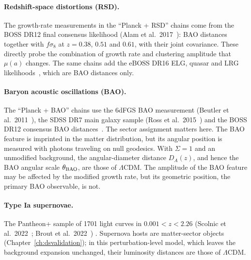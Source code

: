 \paragraph{Redshift-space distortions (RSD).} The growth-rate measurements in the ``Planck + RSD'' chains come from the BOSS DR12 final consensus
likelihood (Alam et al.\ 2017~\cite{Alam2017}): BAO distances together with $f\sigma_8$ at $z=0.38$, $0.51$ and $0.61$, with their joint covariance.
These directly probe the combination of growth rate and clustering amplitude that $\mu(a)$ changes. The same chains add the eBOSS DR16 ELG, quasar
and LRG likelihoods~\cite{Alam2021}, which are BAO distances only.

\paragraph{Baryon acoustic oscillations (BAO).} The ``Planck + BAO'' chains use the 6dFGS BAO measurement (Beutler et al.\ 2011~\cite{Beutler2011BAO}),
the SDSS DR7 main galaxy sample (Ross et al.\ 2015~\cite{Ross2015MGS}) and the BOSS DR12 consensus BAO distances~\cite{Alam2017}. The sector
assignment matters here. The BAO feature is imprinted in the matter distribution, but its angular position is measured with photons traveling on
null geodesics. With $\Sigma=1$ and an unmodified background, the angular-diameter distance $D_A(z)$, and hence the BAO angular scale
$\theta_{\rm BAO}$, are those of $\Lambda$CDM. The amplitude of the BAO feature may be affected by the modified growth rate, but its geometric position,
the primary BAO observable, is not.

\paragraph{Type Ia supernovae.} The Pantheon+ sample of 1701 light curves in $0.001<z<2.26$ (Scolnic et al.\ 2022~\cite{Scolnic2022}; Brout et al.\
2022~\cite{Brout2022}) \observed. Supernova hosts are matter-sector objects (Chapter~\ref{ch:dsvalidation}); in this perturbation-level model, which leaves
the background expansion unchanged, their luminosity distances are those of $\Lambda$CDM.

